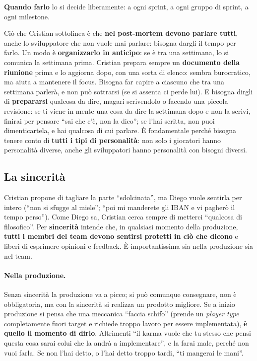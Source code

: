 \textbf{Quando farlo} lo si decide liberamente: a ogni sprint, a ogni gruppo di
sprint, a ogni milestone.

Ciò che Cristian sottolinea è che \textbf{nel post-mortem devono parlare tutti},
anche lo sviluppatore che non vuole mai parlare: bisogna dargli il tempo per
farlo. Un modo è \textbf{organizzarlo in anticipo}: se è tra una settimana, lo si
comunica la settimana prima. Cristian prepara sempre un \textbf{documento della
riunione} prima e lo aggiorna dopo, con una sorta di elenco: sembra burocratico,
ma aiuta a mantenere il focus. Bisogna far capire a ciascuno che tra una
settimana parlerà, e non può sottrarsi (se si assenta ci perde lui). E bisogna
dirgli di \textbf{prepararsi} qualcosa da dire, magari scrivendolo o facendo una
piccola revisione: se ti viene in mente una cosa da dire la settimana dopo e non
la scrivi, finirai per pensare ``sai che c'è, non la dico''; se l'hai scritta,
non puoi dimenticartela, e hai qualcosa di cui parlare. È fondamentale perché
bisogna tenere conto di \textbf{tutti i tipi di personalità}: non solo i
giocatori hanno personalità diverse, anche gli sviluppatori hanno personalità
con bisogni diversi.

\subsection{La sincerità}

Cristian propone di tagliare la parte ``sdolcinata'', ma Diego vuole sentirla
per intero (``non si sfugge al miele''; ``poi mi manderete gli IBAN e vi pagherò
il tempo perso''). Come Diego sa, Cristian cerca sempre di metterci ``qualcosa di
filosofico''. Per \textbf{sincerità} intende che, in qualsiasi momento della
produzione, \textbf{tutti i membri del team devono sentirsi protetti in ciò che
dicono} e liberi di esprimere opinioni e feedback. È importantissima sia nella
produzione sia nel team.

\paragraph{Nella produzione.} Senza sincerità la produzione va a picco; si può
comunque consegnare, non è obbligatoria, ma con la sincerità si realizza un
prodotto migliore. Se a inizio produzione si pensa che una meccanica ``faccia
schifo'' (prende un \emph{player type} completamente fuori target e richiede
troppo lavoro per essere implementata), \textbf{è quello il momento di dirlo}.
Altrimenti ``il karma vuole che tu stesso che pensi questa cosa sarai colui che la
andrà a implementare'', e la farai male, perché non vuoi farla. Se non l'hai
detto, o l'hai detto troppo tardi, ``ti mangerai le mani''.


